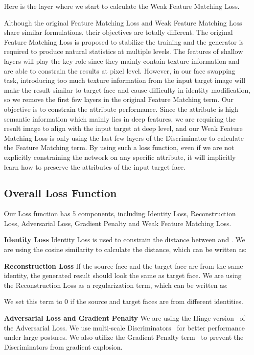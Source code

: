 \documentclass[sigconf]{acmart}
\begin{document}
Here  is the layer where we start to calculate the Weak Feature Matching Loss.

Although the original Feature Matching Loss and Weak Feature Matching Loss share similar formulations, their objectives are totally different. The original Feature Matching Loss is proposed to stabilize the training and the generator is required to produce natural statistics at multiple levels. The features of shallow layers will play the key role since they mainly contain texture information and are able to constrain the results at pixel level. However, in our face swapping task, introducing too much texture information from the input target image will make the result similar to target face and cause difficulty in identity modification, so we remove the first few layers in the original Feature Matching term. Our objective is to constrain the attribute performance. Since the attribute is high semantic information which mainly lies in deep features, we are requiring the result image to align with the input target at deep level, and our Weak Feature Matching Loss is only using the last few layers of the Discriminator to calculate the Feature Matching term. By using such a loss function, even if we are not explicitly constraining the network on any specific attribute, it will implicitly learn how to preserve the attributes of the input target face.



\subsection{Overall Loss Function}

Our Loss function has 5 components, including Identity Loss, Reconstruction Loss, Adversarial Loss, Gradient Penalty and Weak Feature Matching Loss.

\noindent\textbf{Identity Loss} Identity Loss is used to constrain the distance between  and . We are using the cosine similarity to calculate the distance, which can be written as:


\noindent\textbf{Reconstruction Loss} If the source face and the target face are from the same identity, the generated result should look the same as target face. We are using the Reconstruction Loss as a regularization term, which can be written as:

We set this term to 0 if the source and target faces are from different identities.


\noindent\textbf{Adversarial Loss and Gradient Penalty}  We are using the Hinge version~\cite{DBLP:SPADE,DBLP:BigGAN,DBLP:FUNIT} of the Adversarial Loss. We use multi-scale Discriminators~\cite{DBLP:pix2pixHD} for better performance under large postures. We also utilize the Gradient Penalty term~\cite{DBLP:WGAN,DBLP:WGAN-GP} to prevent the Discriminators from gradient explosion.
\end{document}
